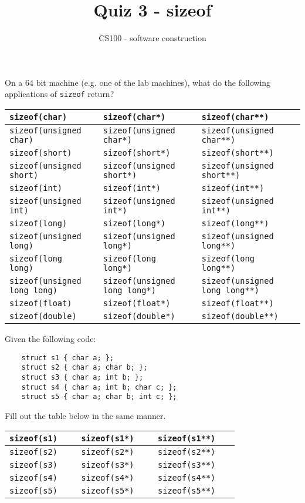 \documentclass{article}
\title{Quiz 3 - sizeof}
\author{CS100 - software construction}
\newcommand{\sizeof}[1]{\texttt{sizeof({#1})~~~}}
\newcommand{\ptr}[1]{\sizeof{{#1}} & \sizeof{{#1}*} & \sizeof{{#1}**}\vspace{0.45in}\\\hline}
\newcommand{\ptrU}[1]{
    \ptr{{#1}}
    \ptr{unsigned {#1}}
    }
\begin{document}
\maketitle

On a 64 bit machine (e.g. one of the lab machines), what do the following applications of \texttt{sizeof} return?
\vspace{0.15in}

\noindent
\begin{tabular}{p{2.3in}p{2.3in}p{2.3in}}
\hline
\ptrU{char}
\ptrU{short}
\ptrU{int}
\ptrU{long}
\ptrU{long long}
\ptr{float}
\ptr{double}
\end{tabular}

\newpage
Given the following code:
\begin{lstlisting}
    struct s1 { char a; };
    struct s2 { char a; char b; };
    struct s3 { char a; int b; };
    struct s4 { char a; int b; char c; };
    struct s5 { char a; char b; int c; };
\end{lstlisting}
Fill out the table below in the same manner.
\vspace{0.15in}

\noindent
\begin{tabular}{p{2.3in}p{2.3in}p{2.3in}}
\hline
\ptr{s1}
\ptr{s2}
\ptr{s3}
\ptr{s4}
\ptr{s5}
\end{tabular}
\end{document}

